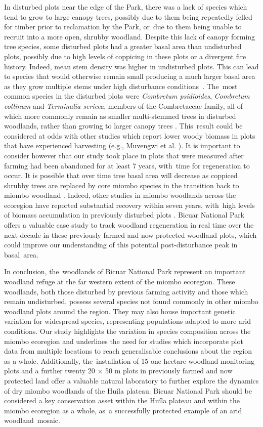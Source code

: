 \documentclass[diversity,article,accept,moreauthors,pdftex]{Definitions/mdpi}
\begin{document}
In disturbed plots near the edge of the Park, there was a lack of species which tend to grow to large canopy trees, possibly due to them being repeatedly felled for timber prior to reclamation by the Park, or~due to them being unable to recruit into a more open, shrubby woodland. Despite this lack of canopy forming tree species, some disturbed plots had a greater basal area than undisturbed plots, possibly due to high levels of coppicing in these plots or a divergent fire history. Indeed, mean stem density was higher in undisturbed plots. This can lead to species that would otherwise remain small producing a much larger basal area as they grow multiple stems under high disturbance conditions~\citep{Luoga2004}. The~most common species in the disturbed plots were \textit{Combretum psidioides}, \textit{Combretum collinum} and \textit{Terminalia sericea}, members of the Combretaceae family, all of which more commonly remain as smaller multi-stemmed trees in disturbed woodlands, rather than growing to larger canopy trees \citep{Wyk2014}. This~result could be considered at odds with other studies which report lower woody biomass in plots that have experienced harvesting (e.g., Muvengwi et al. \cite{Muvengwi2020}). It is important to consider however that our study took place in plots that were measured after farming had been abandoned for at least 7 years, with~time for regeneration to occur. It is possible that over time tree basal area will decrease as coppiced shrubby trees are replaced by core miombo species in the transition back to miombo woodland \citep{Goncalves2017}. Indeed, other studies in miombo woodlands across the ecoregion have reported substantial recovery within seven years, with~high levels of biomass accumulation in previously disturbed plots \citep{Chidumayo2013, Goncalves2017}. Bicuar National Park offers a valuable case study to track woodland regeneration in real time over the next decade in these previously farmed and now protected woodland plots, which could improve our understanding of this potential post-disturbance peak in basal~area.

In conclusion, the~woodlands of Bicuar National Park represent an important woodland refuge at the far western extent of the miombo ecoregion. These woodlands, both those disturbed by previous farming activity and those which remain undisturbed, possess several species not found commonly in other miombo woodland plots around the region. They may also house important genetic variation for widespread species, representing populations adapted to more arid conditions. Our study highlights the variation in species composition across the miombo ecoregion and underlines the need for studies which incorporate plot data from multiple locations to reach generalisable conclusions about the region as a whole. Additionally, the~installation of 15 one hectare woodland monitoring plots and a further twenty 20 $\times$ 50 m plots in previously farmed and now protected land offer a valuable natural laboratory to further explore the dynamics of dry miombo woodlands of the Hu\'{i}la plateau. Bicuar National Park should be considered a key conservation asset within the Hu\'{i}la plateau and within the miombo ecoregion as a whole, as~a successfully protected example of an arid woodland~mosaic.
\end{document}

